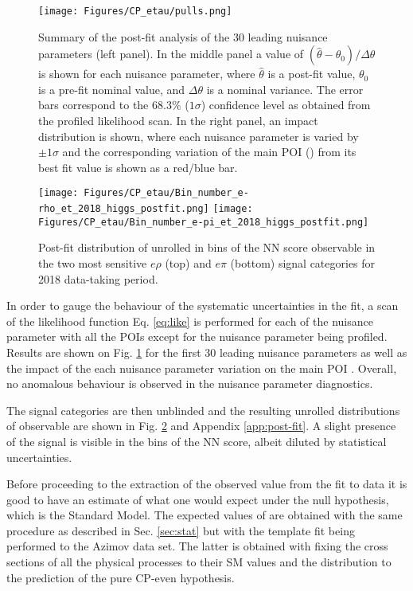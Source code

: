\begin{figure}[H]
    \centering
    \texttt{[image: Figures/CP\_etau/pulls.png]}
    \caption{Summary of the post-fit analysis of the 30 leading nuisance parameters (left panel). In the middle panel a value of $(\hat{\theta} - \theta_0)/\Delta\theta$ is shown for each nuisance parameter, where $\hat{\theta}$ is a post-fit value, $\theta_0$ is a pre-fit nominal value, and $\Delta\theta$ is a nominal variance. The error bars correspond to the $68.3\%$ ($1\sigma$) confidence level as obtained from the profiled likelihood scan. In the right panel, an impact distribution is shown, where each nuisance parameter is varied by $\pm1\sigma$ and the corresponding variation of the main POI (\mixa) from its best fit value is shown as a red/blue bar.}
    \label{fig:pulls}
\end{figure}

\begin{figure}[H]
    \centering
    \texttt{[image: Figures/CP\_etau/Bin\_number\_e-rho\_et\_2018\_higgs\_postfit.png]}
    \texttt{[image: Figures/CP\_etau/Bin\_number\_e-pi\_et\_2018\_higgs\_postfit.png]}
    \caption{Post-fit distribution of unrolled in bins of the NN score \phicp observable in the two most sensitive $e\rho$ (top) and $e\pi$ (bottom) signal categories for 2018 data-taking period.}
    \label{fig:sig_cat_postfit}
\end{figure}

In order to gauge the behaviour of the systematic uncertainties in the fit, a scan of the likelihood function Eq. \ref{eq:like} is performed for each of the nuisance parameter with all the POIs except for the nuisance parameter being profiled. Results are shown on Fig. \ref{fig:pulls} for the first 30 leading nuisance parameters as well as the impact of the each nuisance parameter variation on the main POI \mixa. Overall, no anomalous behaviour is observed in the nuisance parameter diagnostics.  

The signal categories are then unblinded and the resulting unrolled distributions of \phicp observable are shown in Fig. \ref{fig:sig_cat_postfit} and Appendix \ref{app:post-fit}. A slight presence of the \htt signal is visible in the bins of the NN score, albeit diluted by statistical uncertainties. 

Before proceeding to the extraction of the observed \mixa value from the fit to data it is good to have an estimate of what one would expect under the null hypothesis, which is the Standard Model. The expected values of \mixa are obtained with the same procedure as described in Sec. \ref{sec:stat} but with the template fit being performed to the Azimov data set. The latter is obtained with fixing the cross sections of all the physical processes to their SM values and the \phicp distribution to the prediction of the pure CP-even hypothesis. 


